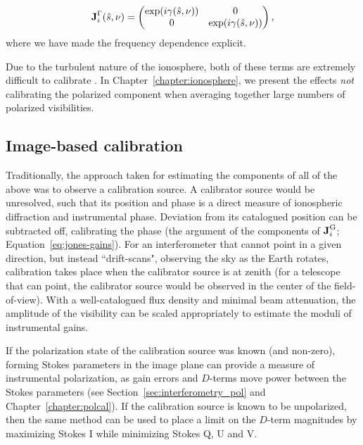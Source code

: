 \begin{equation}
\textbf{J}_i^{\rm \Gamma}(\hat{s},\nu) = 
\begin{pmatrix}
\exp(i\gamma(\hat{s},\nu)) &0 \\
0 & \exp(i\gamma(\hat{s},\nu))\\
\end{pmatrix},
\end{equation}
where we have made the frequency dependence explicit.

Due to the turbulent nature of the ionosphere, both of these terms are extremely difficult to calibrate \citep{Intema.09, Vedantham.15}. In Chapter~\ref{chapter:ionosphere}, we present the effects \textit{not} calibrating the polarized component when averaging together large numbers of polarized visibilities.

\subsection{Image-based calibration}

Traditionally, the approach taken for estimating the components of all of the above was to observe a calibration source. A calibrator source would be unresolved, such that its position and phase is a direct measure of ionospheric diffraction and instrumental phase. Deviation from its catalogued position can be subtracted off, calibrating the phase (the argument of the components of $\textbf{J}_i^{\rm G}$; Equation~\ref{eq:jones-gains}). For an interferometer that cannot point in a given direction, but instead ``drift-scans", observing the sky as the Earth rotates, calibration takes place when the calibrator source is at zenith (for a telescope that can point, the calibrator source would be observed in the center of the field-of-view). With a well-catalogued flux density and minimal beam attenuation, the amplitude of the visibility can be scaled appropriately to estimate the moduli of instrumental gains.

If the polarization state of the calibration source was known (and non-zero), forming Stokes parameters in the image plane can provide a measure of instrumental polarization, as gain errors and $D$-terms move power between the Stokes parameters (see Section~\ref{sec:interferometry_pol} and Chapter~\ref{chapter:polcal}). If the calibration source is known to be unpolarized, then the same method can be used to place a limit on the $D$-term magnitudes by maximizing Stokes I while minimizing Stokes Q, U and V.

